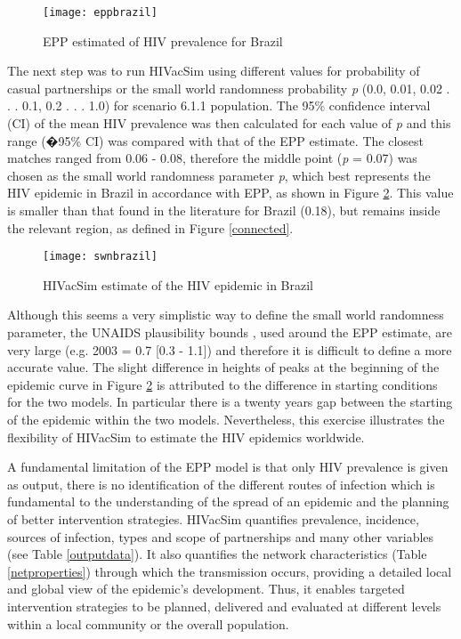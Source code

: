 \begin{figure}[ht]
\texttt{[image: eppbrazil]}
\caption{EPP estimated of HIV prevalence for Brazil} \label{eppbrazil}
\end{figure}

The next step was to run HIVacSim using different values for probability of casual
partnerships or the small world randomness probability \emph{p} (0.0, 0.01, 0.02 . . .
0.1, 0.2 . . . 1.0) for scenario 6.1.1 population. The 95\% confidence interval (CI) of
the mean HIV prevalence was then calculated for each value of \emph{p} and this range
(�95\% CI) was compared with that of the EPP estimate. The closest matches ranged from
0.06 - 0.08, therefore the middle point (\emph{p} = 0.07) was chosen as the small world
randomness parameter \emph{p}, which best represents the HIV epidemic in Brazil in
accordance with EPP, as shown in Figure \ref{swnbrazil}. This value is smaller than that
found in the literature for Brazil (0.18), but remains inside the relevant region, as
defined in Figure \ref{connected}.
\begin{figure}[h]
\texttt{[image: swnbrazil]}
\caption{HIVacSim estimate of the HIV epidemic in Brazil} \label{swnbrazil}
\end{figure}

Although this seems a very simplistic way to define the small world randomness parameter,
the UNAIDS plausibility bounds  \cite{Glassly2004}, used around the EPP estimate, are
very large (e.g. 2003 = 0.7 [0.3 - 1.1]) and therefore it is difficult to define a more
accurate value. The slight difference in heights of peaks at the beginning of the
epidemic curve in Figure \ref{swnbrazil} is attributed to the difference in starting
conditions for the two models. In particular there is a twenty years gap between the
starting of the epidemic within the two models. Nevertheless, this exercise illustrates
the flexibility of HIVacSim to estimate the HIV epidemics worldwide.

A fundamental limitation of the EPP model is that only HIV prevalence is given as output,
there is no identification of the different routes of infection which is fundamental to
the understanding of  the spread of an epidemic and the planning of better intervention
strategies. HIVacSim quantifies prevalence, incidence, sources of infection, types and
scope of partnerships and many other variables (see Table \ref{outputdata}). It also
quantifies the network characteristics (Table \ref{netproperties}) through which the
transmission occurs, providing a detailed local and global view of the epidemic's
development. Thus, it enables targeted intervention strategies to be planned, delivered
and evaluated at different levels within a local community or the overall population.


